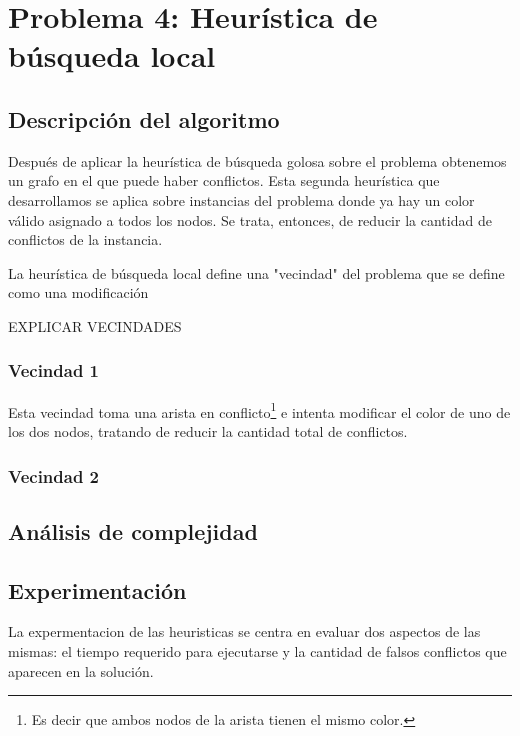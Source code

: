 \section{Problema 4: Heurística de búsqueda local}

\subsection{Descripción del algoritmo}

Después de aplicar la heurística de búsqueda golosa sobre el problema obtenemos un grafo en el que puede haber conflictos. Esta segunda heurística que desarrollamos se aplica sobre instancias del problema donde ya hay un color válido asignado a todos los nodos. Se trata, entonces, de reducir la cantidad de conflictos de la instancia.

La heurística de búsqueda local define una "vecindad" del problema que se define como una modificación 

EXPLICAR VECINDADES

\subsubsection{Vecindad 1}

Esta vecindad toma una arista en conflicto\footnote{Es decir que ambos nodos de la arista tienen el mismo color.} e intenta modificar el color de uno de los dos nodos, tratando de reducir la cantidad total de conflictos.

% 

\subsubsection{Vecindad 2}

\subsection{Análisis de complejidad}






\subsection{Experimentación}
La expermentacion de las heuristicas se centra en evaluar dos aspectos de las mismas: el tiempo requerido para ejecutarse y la cantidad de falsos conflictos que aparecen en la solución.

